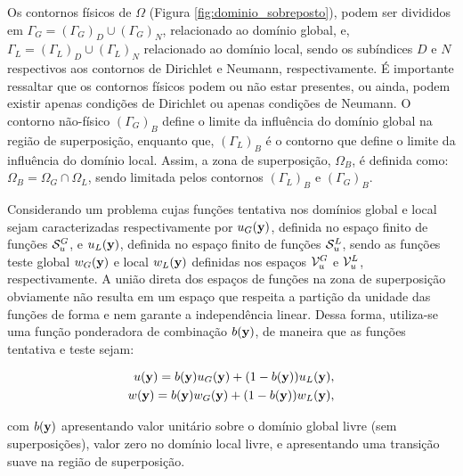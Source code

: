 Os contornos físicos de $\Omega$  (Figura \ref{fig:dominio_sobreposto}), podem ser divididos em $\Gamma_{G} = (\Gamma_{G})_D \cup (\Gamma_{G})_N$, relacionado ao domínio global, e, $\Gamma_{L} = (\Gamma_{L})_D \cup (\Gamma_{L})_N$ relacionado ao domínio local, sendo os subíndices $D$ e $N$ respectivos aos contornos de Dirichlet e Neumann, respectivamente. É importante ressaltar que os contornos físicos podem ou não estar presentes, ou ainda, podem existir apenas condições de Dirichlet ou apenas condições de Neumann. O contorno não-físico $(\Gamma_{G})_{B}$ define o limite da influência do domínio global na região de superposição, enquanto que, $(\Gamma_{L})_{B}$ é o contorno que define o limite da influência do domínio local. Assim, a zona de superposição, $\Omega_{B}$, é definida como: $ \Omega_{B} = \Omega_G \cap \Omega_L$, sendo limitada pelos contornos $(\Gamma_{L})_{B}$ e $(\Gamma_{G})_{B}$.

Considerando um problema cujas funções tentativa nos domínios global e local sejam caracterizadas respectivamente por $u_{G}(\mathbf{y})$, definida no espaço finito de funções $\mathcal{S}_u^{G}$, e $u_{L}(\mathbf{y})$, definida no espaço finito de funções $\mathcal{S}_u^{L}$, sendo as funções teste global $w_{G}(\mathbf{y})$ e local $w_{L}(\mathbf{y})$ definidas nos espaços $\mathcal{V}_u^{G}$ e $\mathcal{V}_u^{L}$, respectivamente. A união direta dos espaços de funções na zona de superposição obviamente não resulta em um espaço que respeita a partição da unidade das funções de forma e nem garante a independência linear. Dessa forma, utiliza-se uma função ponderadora de combinação $b(\mathbf{y})$, de maneira que as funções tentativa e teste sejam:

\begin{align}
	u(\mathbf{y}) = b(\mathbf{y})u_{G}(\mathbf{y}) + (1-b(\mathbf{y}))u_{L}(\mathbf{y}),\\
	w(\mathbf{y}) = b(\mathbf{y})w_{G}(\mathbf{y}) + (1-b(\mathbf{y}))w_{L}(\mathbf{y}),
\end{align}

\noindent com $b(\mathbf{y})$ apresentando valor unitário sobre o domínio global livre (sem superposições), valor zero no domínio local livre, e apresentando uma transição suave na região de superposição. 

